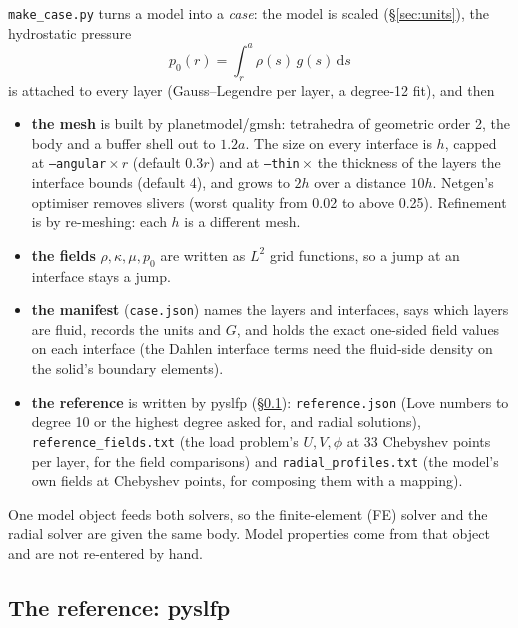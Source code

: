 \documentclass[11pt]{article}
\numberwithin{equation}{section}
\newcommand{\code}[1]{\texttt{#1}}
\begin{document}
\code{make\_case.py} turns a model into a \emph{case}: the model is
scaled (\S\ref{sec:units}), the hydrostatic pressure
\begin{equation}
  p_0(r) = \int_r^a \rho(s)\,g(s)\,\mathrm{d}s
  \label{eq:p0}
\end{equation}
is attached to every layer (Gauss--Legendre per layer, a degree-12 fit),
and then
\begin{itemize}[leftmargin=*]
\item \textbf{the mesh} is built by planetmodel/gmsh: tetrahedra of
  geometric order 2, the body and a buffer shell out to $1.2a$. The size
  on every interface is $h$, capped at \code{--angular}\,$\times\,r$
  (default $0.3r$) and at \code{--thin}\,$\times$ the thickness of the
  layers the interface bounds (default 4), and grows to $2h$ over a
  distance $10h$. Netgen's optimiser removes slivers (worst quality from
  0.02 to above 0.25). Refinement is by re-meshing: each $h$ is a different
  mesh.
\item \textbf{the fields} $\rho,\kappa,\mu,p_0$ are written as $L^2$
  grid functions, so a jump at an interface stays a jump.
\item \textbf{the manifest} (\code{case.json}) names the layers and
  interfaces, says which layers are fluid, records the units and $G$,
  and holds the exact one-sided field values on each interface (the
  Dahlen interface terms need the fluid-side density on the solid's
  boundary elements).
\item \textbf{the reference} is written by pyslfp (\S\ref{sec:reference}):
  \code{reference.json} (Love numbers to degree 10 or the highest degree
  asked for, and radial solutions), \code{reference\_fields.txt} (the load
  problem's $U,V,\phi$ at 33 Chebyshev points per layer, for the field
  comparisons) and \code{radial\_profiles.txt} (the model's own fields at
  Chebyshev points, for composing them with a mapping).
\end{itemize}
One model object feeds both solvers, so the finite-element (FE) solver
and the radial solver are given the same body. Model properties come
from that object and are not re-entered by hand.

\subsection{The reference: pyslfp}
\label{sec:reference}
\end{document}
